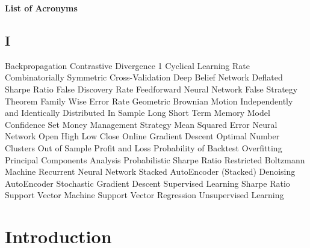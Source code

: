 \documentclass[a4paper,11pt,oneside]{article}
\theoremstyle{plain}
\theoremstyle{definition}
\begin{document}
	\listoftables
	
	\newpage
	
	\LARGE{\textbf{List of Acronyms}}

	\normalsize
	\begin{acronym}[OCSVM]  %
	
	\section*{I}
		
			Backpropagation
			Contrastive Divergence 1
			Cyclical Learning Rate
			Combinatorially Symmetric Cross-Validation
			Deep Belief Network
			Deflated Sharpe Ratio
			False Discovery Rate
			Feedforward Neural Network
			False Strategy Theorem
			Family Wise Error Rate
			Geometric Brownian Motion
				Independently and Identically Distributed
				In Sample
			Long Short Term Memory
			Model Confidence Set
			Money Management Strategy
			Mean Squared Error
			Neural Network
	 Open High Low Close
			Online Gradient Descent
			Optimal Number Clusters
			Out of Sample
	 			Profit and Loss
			Probability of Backtest Overfitting
			Principal Components Analysis
			Probabilistic Sharpe Ratio
			Restricted Boltzmann Machine
			Recurrent Neural Network
			Stacked AutoEncoder
	 (Stacked) Denoising AutoEncoder
			Stochastic Gradient Descent
				Supervised Learning
				Sharpe Ratio
				Support Vector Machine
				Support Vector Regression
				Unsupervised Learning
		
		
		
	\end{acronym}
	
	\newpage
	
	
	\section{Introduction}\label{Introduction}
	
\end{document}
